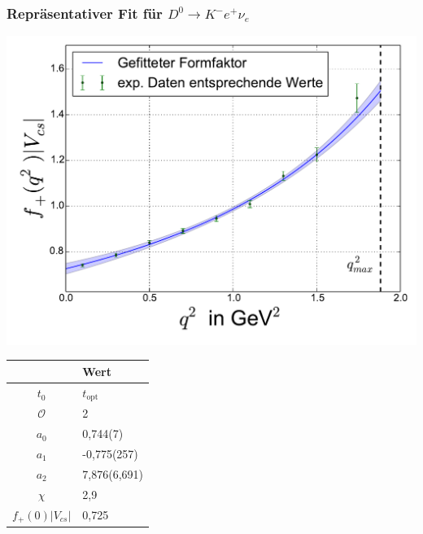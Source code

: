 \documentclass[hyperref={pdfpagelabels=false}]{beamer}
\begin{document}
\begin{frame}
 \frametitle{Repräsentativer Fit für $D^0\rightarrow K^- e^+ \nu_e$}
  \begin{minipage}[h]{0.66\textwidth}
  \includegraphics[width=1.0\textwidth]{../Fit/D0-2O-topt.pdf}
 \end{minipage}
 \begin{minipage}[h]{0.32\textwidth}
  \begin{table}[h]
   \begin{tabular}{c|l}
   \toprule
     & Wert\\
    \midrule
    $t_0$ & $t_\text{opt}$\\
    $\mathcal{O}$ & 2\\
    \midrule
    $a_0$ & 0,744(7)\\
    $a_1$ & -0,775(257)\\
    $a_2$ & 7,876(6,691)\\
    \midrule
    $\chi$ & 2,9\\
    $f_+(0)|V_{cs}|$ & 0,725\\
    \bottomrule\bottomrule
   \end{tabular}

  \end{table}

 \end{minipage}
\end{frame}
\end{document}
